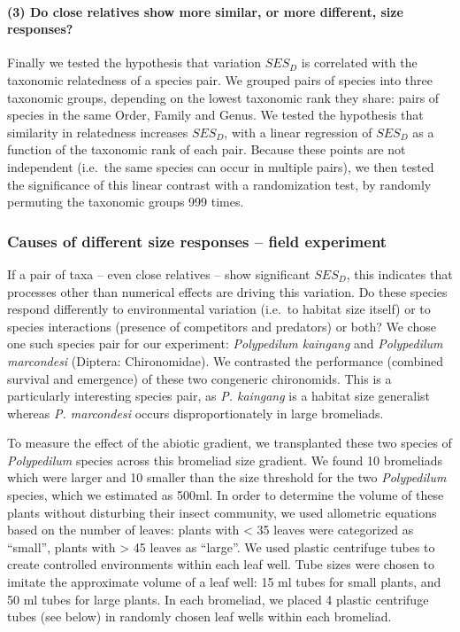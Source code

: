 \paragraph{(3) Do close relatives show more similar, or more different,
size
responses?}\label{do-close-relatives-show-more-similar-or-more-different-size-responses}

Finally we tested the hypothesis that variation \(SES_{D}\) is
correlated with the taxonomic relatedness of a species pair. We grouped
pairs of species into three taxonomic groups, depending on the lowest
taxonomic rank they share: pairs of species in the same Order, Family
and Genus. We tested the hypothesis that similarity in relatedness
increases \(SES_{D}\), with a linear regression of \(SES_{D}\) as a
function of the taxonomic rank of each pair. Because these points are
not independent (i.e.~the same species can occur in multiple pairs), we
then tested the significance of this linear contrast with a
randomization test, by randomly permuting the taxonomic groups 999
times.

\subsubsection{Causes of different size responses -- field
experiment}\label{causes-of-different-size-responses-field-experiment}

If a pair of taxa -- even close relatives -- show significant
\(SES_{D}\), this indicates that processes other than numerical effects
are driving this variation. Do these species respond differently to
environmental variation (i.e.~to habitat size itself) or to species
interactions (presence of competitors and predators) or both? We chose
one such species pair for our experiment: \emph{Polypedilum kaingang}
and \emph{Polypedilum marcondesi} (Diptera: Chironomidae). We contrasted
the performance (combined survival and emergence) of these two
congeneric chironomids. This is a particularly interesting species pair,
as \emph{P. kaingang} is a habitat size generalist whereas \emph{P.
marcondesi} occurs disproportionately in large bromeliads.

To measure the effect of the abiotic gradient, we transplanted these two
species of \emph{Polypedilum} species across this bromeliad size
gradient. We found 10 bromeliads which were larger and 10 smaller than
the size threshold for the two \emph{Polypedilum} species, which we
estimated as 500ml. In order to determine the volume of these plants
without disturbing their insect community, we used allometric equations
based on the number of leaves: plants with \textless{} 35 leaves were
categorized as ``small'', plants with \textgreater{} 45 leaves as
``large''. We used plastic centrifuge tubes to create controlled
environments within each leaf well. Tube sizes were chosen to imitate
the approximate volume of a leaf well: 15 ml tubes for small plants, and
50 ml tubes for large plants. In each bromeliad, we placed 4 plastic
centrifuge tubes (see below) in randomly chosen leaf wells within each
bromeliad.

